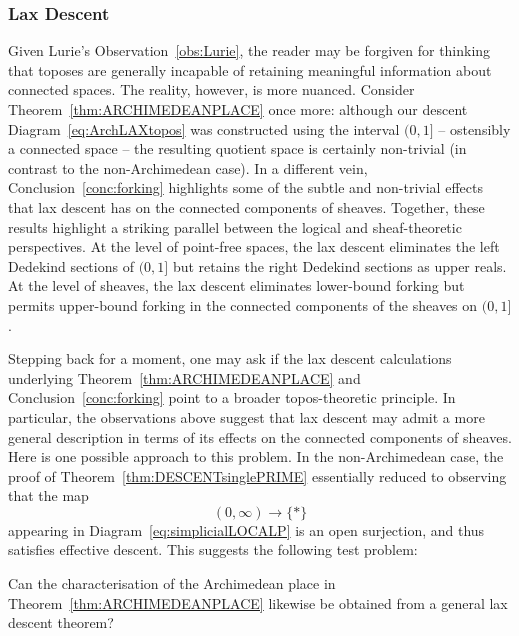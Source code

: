 \documentclass[a4paper, 11pt,reqno]{amsart}
\begin{document}

\subsubsection{Lax Descent} Given Lurie's Observation~\ref{obs:Lurie}, the reader may be forgiven for thinking that toposes are generally incapable of retaining meaningful
information about connected spaces. The reality, however, is more nuanced. Consider
Theorem~\ref{thm:ARCHIMEDEANPLACE} once more: although our descent Diagram~\eqref{eq:ArchLAXtopos} was constructed using the interval $(0,1]$ -- ostensibly a connected space -- the resulting quotient space is certainly non-trivial (in contrast to the non-Archimedean case). In a different vein, Conclusion~\ref{conc:forking} highlights some of the subtle and non-trivial effects that lax descent has on the connected components of sheaves. Together, these results highlight a striking parallel between the logical and sheaf-theoretic perspectives. At the level of point-free spaces,  the lax descent eliminates the left Dedekind sections of $(0,1]$ but retains the right Dedekind sections as upper reals. At the level of sheaves, the lax descent eliminates lower-bound forking but permits upper-bound forking in the connected components of the sheaves on $(0,1]$. 

\smallskip
Stepping back for a moment, one may ask if the lax descent calculations underlying Theorem~\ref{thm:ARCHIMEDEANPLACE} and Conclusion~\ref{conc:forking} point to a broader topos-theoretic principle. In particular, the observations above suggest that lax descent may admit a more general description in terms of its effects on the connected components of sheaves. Here is one possible approach to this problem. In the non-Archimedean case, the proof of Theorem~\ref{thm:DESCENTsinglePRIME} essentially reduced to observing that the map $$(0,\infty)\to \{\ast\}$$
appearing in Diagram~\eqref{eq:simplicialLOCALP} is an open surjection, and thus satisfies effective descent. This suggests the following test problem:

\begin{problem} Can the characterisation of the Archimedean place in Theorem~\ref{thm:ARCHIMEDEANPLACE} likewise be obtained from a general lax descent theorem?
\end{problem}
\end{document}
